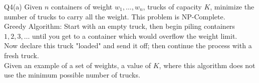 \begin{problem}
    {Q4(a)}
    Given $n$ containers of weight $w_1, \dots, w_n$, trucks of capacity $K$, minimize the number of trucks to carry all the weight. This problem is NP-Complete. \\
    Greedy Algorithm: Start with an empty truck, then begin piling containers $1, 2, 3, \dots$ until you get to a container which would overflow the weight limit. \\
    Now declare this truck "loaded" and send it off; then continue the process with a fresh truck. \\
    Given an example of a set of weights, a value of $K$, where this algorithm does not use the minimum possible number of trucks. \\
\end{problem}
